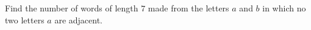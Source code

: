 Find the number of words of length $7$ made from the letters $a$ and $b$ in which no two letters $a$ are adjacent.
